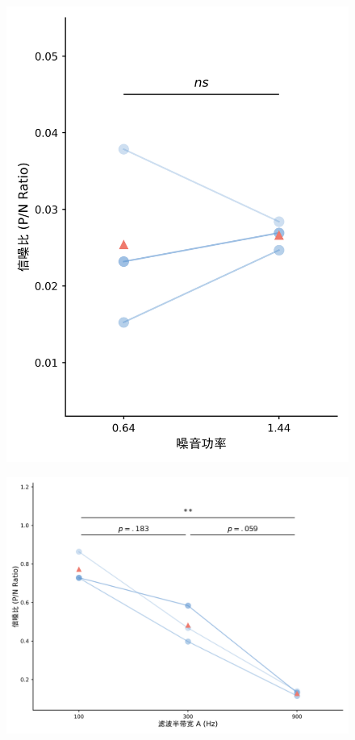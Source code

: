 \documentclass[jou,12pt,floatsintext]{apa7} %
\begin{document}
\begin{figure}[bp]
    \centering
    \begin{minipage}{0.342\textwidth}
        \centering
        \subcaption{}
        \vspace{-0.5em}
        \includegraphics[width=\textwidth]{figure/ALL_participants_threshold_summary.png}
        \label{fig:exp1}
    \end{minipage}
    \begin{minipage}{0.608\textwidth}
        \centering
        \subcaption{}
        \vspace{-0.5em}
        \includegraphics[width=\textwidth]{figure/EXP2_BW_ALL_participants_threshold_summary.png}

\end{minipage}
\end{figure}
\end{document}
